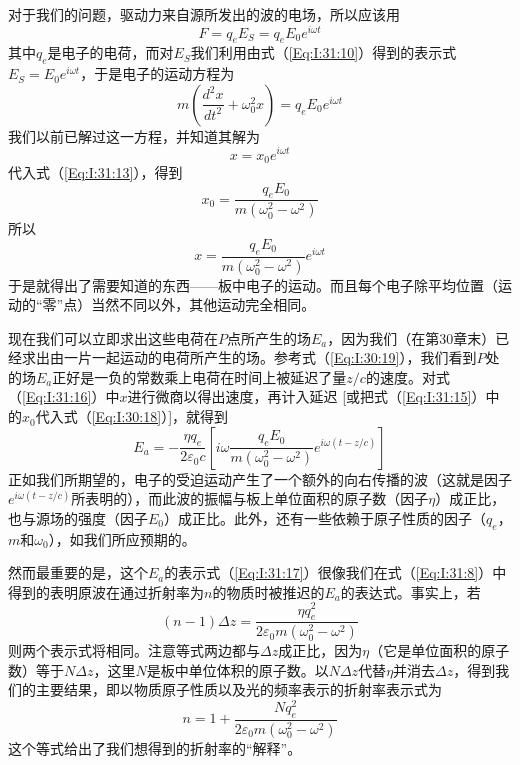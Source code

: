 对于我们的问题，驱动力来自源所发出的波的电场，所以应该用
\begin{equation}
    \label{Eq:I:31:12}
    F = q_eE_S = q_eE_0e^{i\omega t}
\end{equation}
其中$q_e$是电子的电荷，而对$E_S$我们利用由式（\ref{Eq:I:31:10}）得到的表示式$E_S=E_0e^{i\omega t}$，于是电子的运动方程为
\begin{equation}
    \label{Eq:I:31:13}
    m\left ( \frac{d^2x}{dt^2} + \omega_0^2x \right ) = q_eE_0e^{i\omega t}
\end{equation}
我们以前已解过这一方程，并知道其解为
\begin{equation}
    \label{Eq:I:31:14}
    x=x_0e^{i\omega t}
\end{equation}
代入式（\ref{Eq:I:31:13}），得到
\begin{equation}
    \label{Eq:I:31:15}
    x_0 = \frac{q_eE_0}{m(\omega_0^2 - \omega^2)}
\end{equation}
所以
\begin{equation}
    \label{Eq:I:31:16}
    x = \frac{q_eE_0}{m(\omega_0^2 - \omega^2)}e^{i\omega t}
\end{equation}
于是就得出了需要知道的东西——板中电子的运动。而且每个电子除平均位置（运动的“零”点）当然不同以外，其他运动完全相同。

现在我们可以立即求出这些电荷在$P$点所产生的场$E_a$，因为我们（在第30章末）已经求出由一片一起运动的电荷所产生的场。参考式（\ref{Eq:I:30:19}），我们看到$P$处的场$E_a$正好是一负的常数乘上电荷在时间上被延迟了量$z/c$的速度。对式（\ref{Eq:I:31:16}）中$x$进行微商以得出速度，再计入延迟 [或把式（\ref{Eq:I:31:15}）中的$x_0$代入式（\ref{Eq:I:30:18}）]，就得到
\begin{equation}
    \label{Eq:I:31:17}
    E_a = -\frac{\eta q_e}{2\varepsilon_0 c}\left [ i\omega\frac{q_eE_0}{m(\omega_0^2 - \omega^2)}e^{i\omega(t-z/c)} \right ]
\end{equation}
正如我们所期望的，电子的受迫运动产生了一个额外的向右传播的波（这就是因子$e^{i\omega(t-z/c)}$所表明的），而此波的振幅与板上单位面积的原子数（因子$\eta$）成正比，也与源场的强度（因子$E_0$）成正比。此外，还有一些依赖于原子性质的因子（$q_e$，$m$和$\omega_0$），如我们所应预期的。

然而最重要的是，这个$E_a$的表示式（\ref{Eq:I:31:17}）很像我们在式（\ref{Eq:I:31:8}）中得到的表明原波在通过折射率为$n$的物质时被推迟的$E_a$的表达式。事实上，若
\begin{equation}
    \label{Eq:I:31:18}
    (n-1)\Delta z=\frac{\eta q_e^2}{2\varepsilon_0m(\omega_0^2-\omega^2)}
\end{equation}
则两个表示式将相同。注意等式两边都与$\Delta z$成正比，因为$\eta$（它是单位面积的原子数）等于$N \Delta z$，这里$N$是板中单位体积的原子数。以$N\Delta z$代替$\eta$并消去$\Delta z$，得到我们的主要结果，即以物质原子性质以及光的频率表示的折射率表示式为
\begin{equation}
    \label{Eq:I:31:19}
    n = 1 + \frac{Nq_e^2}{2\varepsilon_0m(\omega_0^2-\omega^2)}
\end{equation}
这个等式给出了我们想得到的折射率的“解释”。

